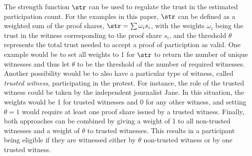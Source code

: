 The strength function \(\str\) can be used to regulate the trust in the 
estimated participation count.
For the examples in this paper, \(\str\) can be defined as a weighted sum of 
the proof shares, \(\str = \sum \omega_i s_i\), with the weights \(\omega_i\) 
being the trust in the witness corresponding to the proof share \(s_i\), and 
the threshold \(\theta\) represents the total trust needed to accept a proof of 
particiption as valid.
One example would be to set all weights to 1 for \(\str\) to return the number of unique witnesses and thus let \(\theta\) to be the threshold of the number of required witnesses.
Another possibility would be to also have a particular type of witness, called 
\emph{trusted witness}, participating in the protest. For instance, the role of 
the trusted witness could be taken by the independent journalist Jane.
In this situation, the weights would be 1 for trusted witnesses and 
0 for any other witness, and
setting \(\theta = 1\) would require at least one proof share issued by a 
trusted witness.
Finally, both approaches can be combined by giving a weight of 1 to all 
non-trusted witnesses and a weight of \(\theta\) to trusted witnesses. This 
results in a participant being eligible if they are witnessed either by \(\theta\) 
non-trusted witness or by one trusted witness.

